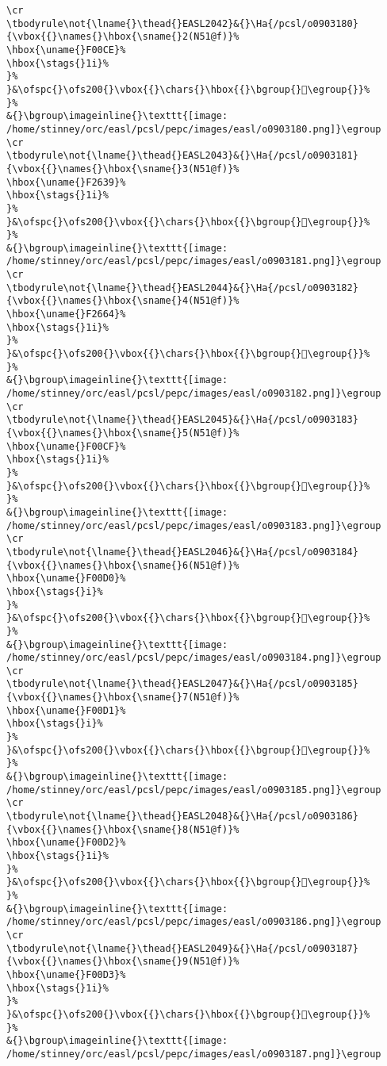 \begin{verbatim}
\cr
\tbodyrule\not{\lname{}\thead{}EASL2042}&{}\Ha{/pcsl/o0903180}{\vbox{{}\names{}\hbox{\sname{}2(N51@f)}%
\hbox{\uname{}F00CE}%
\hbox{\stags{}1i}%
}%
}&\ofspc{}\ofs200{}\vbox{{}\chars{}\hbox{{}\bgroup{}󰃎\egroup{}}%
}%
&{}\bgroup\imageinline{}\texttt{[image: /home/stinney/orc/easl/pcsl/pepc/images/easl/o0903180.png]}\egroup
\cr
\tbodyrule\not{\lname{}\thead{}EASL2043}&{}\Ha{/pcsl/o0903181}{\vbox{{}\names{}\hbox{\sname{}3(N51@f)}%
\hbox{\uname{}F2639}%
\hbox{\stags{}1i}%
}%
}&\ofspc{}\ofs200{}\vbox{{}\chars{}\hbox{{}\bgroup{}󲘹\egroup{}}%
}%
&{}\bgroup\imageinline{}\texttt{[image: /home/stinney/orc/easl/pcsl/pepc/images/easl/o0903181.png]}\egroup
\cr
\tbodyrule\not{\lname{}\thead{}EASL2044}&{}\Ha{/pcsl/o0903182}{\vbox{{}\names{}\hbox{\sname{}4(N51@f)}%
\hbox{\uname{}F2664}%
\hbox{\stags{}1i}%
}%
}&\ofspc{}\ofs200{}\vbox{{}\chars{}\hbox{{}\bgroup{}󲙤\egroup{}}%
}%
&{}\bgroup\imageinline{}\texttt{[image: /home/stinney/orc/easl/pcsl/pepc/images/easl/o0903182.png]}\egroup
\cr
\tbodyrule\not{\lname{}\thead{}EASL2045}&{}\Ha{/pcsl/o0903183}{\vbox{{}\names{}\hbox{\sname{}5(N51@f)}%
\hbox{\uname{}F00CF}%
\hbox{\stags{}1i}%
}%
}&\ofspc{}\ofs200{}\vbox{{}\chars{}\hbox{{}\bgroup{}󰃏\egroup{}}%
}%
&{}\bgroup\imageinline{}\texttt{[image: /home/stinney/orc/easl/pcsl/pepc/images/easl/o0903183.png]}\egroup
\cr
\tbodyrule\not{\lname{}\thead{}EASL2046}&{}\Ha{/pcsl/o0903184}{\vbox{{}\names{}\hbox{\sname{}6(N51@f)}%
\hbox{\uname{}F00D0}%
\hbox{\stags{}i}%
}%
}&\ofspc{}\ofs200{}\vbox{{}\chars{}\hbox{{}\bgroup{}󰃐\egroup{}}%
}%
&{}\bgroup\imageinline{}\texttt{[image: /home/stinney/orc/easl/pcsl/pepc/images/easl/o0903184.png]}\egroup
\cr
\tbodyrule\not{\lname{}\thead{}EASL2047}&{}\Ha{/pcsl/o0903185}{\vbox{{}\names{}\hbox{\sname{}7(N51@f)}%
\hbox{\uname{}F00D1}%
\hbox{\stags{}i}%
}%
}&\ofspc{}\ofs200{}\vbox{{}\chars{}\hbox{{}\bgroup{}󰃑\egroup{}}%
}%
&{}\bgroup\imageinline{}\texttt{[image: /home/stinney/orc/easl/pcsl/pepc/images/easl/o0903185.png]}\egroup
\cr
\tbodyrule\not{\lname{}\thead{}EASL2048}&{}\Ha{/pcsl/o0903186}{\vbox{{}\names{}\hbox{\sname{}8(N51@f)}%
\hbox{\uname{}F00D2}%
\hbox{\stags{}1i}%
}%
}&\ofspc{}\ofs200{}\vbox{{}\chars{}\hbox{{}\bgroup{}󰃒\egroup{}}%
}%
&{}\bgroup\imageinline{}\texttt{[image: /home/stinney/orc/easl/pcsl/pepc/images/easl/o0903186.png]}\egroup
\cr
\tbodyrule\not{\lname{}\thead{}EASL2049}&{}\Ha{/pcsl/o0903187}{\vbox{{}\names{}\hbox{\sname{}9(N51@f)}%
\hbox{\uname{}F00D3}%
\hbox{\stags{}1i}%
}%
}&\ofspc{}\ofs200{}\vbox{{}\chars{}\hbox{{}\bgroup{}󰃓\egroup{}}%
}%
&{}\bgroup\imageinline{}\texttt{[image: /home/stinney/orc/easl/pcsl/pepc/images/easl/o0903187.png]}\egroup

\end{verbatim}
